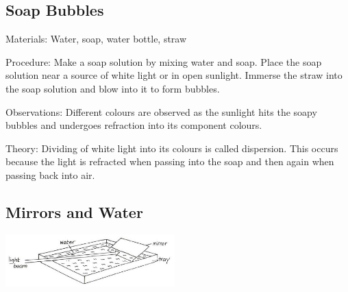 \begin{multicols}{2}
\subsection{Soap Bubbles}


\begin{description*}
\item[Materials:]{Water, soap, water bottle, straw}
\item[Procedure:]{Make a soap solution by mixing water and soap. Place the soap solution near a source of white light or in open sunlight. Immerse the straw into the soap solution and blow into it to form bubbles.}
\item[Observations:]{Different colours are observed as the sunlight hits the soapy bubbles and undergoes refraction into its component colours.}
\item[Theory:]{Dividing of white light into its colours is called dispersion. This occurs because the light is refracted when passing into the soap and then again when passing back into air.}
\end{description*}

\subsection{Mirrors and Water}

\begin{center}
\includegraphics[width=0.49\textwidth]{./img/vso/dispersion-mirror.png}
\end{center}


\end{multicols}
